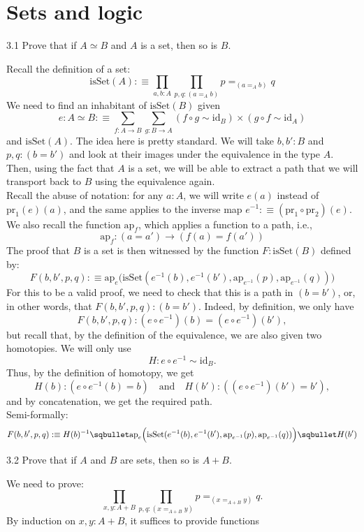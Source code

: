 \documentclass[14pt]{extarticle}
\newcommand{\0}{{\mathbf 0}}
\newcommand{\1}{{\mathbf 1}}
\newcommand{\2}{{\mathbf 2}}
\newcommand{\pr}{\mathrm{pr}}
\newcommand{\id}{\mathrm{id}}
\newcommand{\ap}{\mathrm{ap}}
\newcommand{\isSet}{\mathrm{isSet}}
\begin{document}
\section*{Sets and logic}
\begin{prob}{3.1}{}
Prove that if $A \simeq B$ and $A$ is a set, then so is $B$.
\end{prob}
Recall the definition of a set:
\[\isSet(A) :\equiv \prod_{a,b:A}\prod_{p,q:(a =_A b)} p =_{(a =_A b)} q\]
We need to find an inhabitant of $\isSet(B)$ given \[e : A \simeq B :\equiv \sum_{f:A\to B}\sum_{g:B\to A}(f \circ g \sim \id_{B}) \times (g \circ f \sim \id_{A})\] and $\isSet(A)$. The idea here is pretty standard. We will take $b,b' : B$ and $p,q : (b = b')$ and look at their images under the equivalence in the type $A$. Then, using the fact that $A$ is a set, we will be able to extract a path that we will transport back to $B$ using the equivalence again.\\
Recall the abuse of notation: for any $a : A$, we will write $e(a)$ instead of $\pr_1(e)(a)$, and the same applies to the inverse map $e^{-1} : \equiv (\pr_1 \circ \pr_2)(e)$. We also recall the function $\ap_f$, which applies a function to a path, i.e.,
\[\ap_f : (a = a') \to (f(a) = f(a'))\]
The proof that $B$ is a set is then witnessed by the function $F : \isSet(B)$ defined by:
\[F(b,b',p,q) : \equiv \ap_e\Big(\isSet(e^{-1}(b),e^{-1}(b'), \ap_{e^{-1}}(p), \ap_{e^{-1}}(q))\Big)\]
For this to be a valid proof, we need to check that this is a path in $(b = b')$, or, in other words, that $F(b,b',p,q) : (b = b')$. Indeed, by definition, we only have
\[F(b,b',p,q) : (e \circ e^{-1})(b) = (e \circ e^{-1})(b'),\] but recall that, by the definition of the equivalence, we are also given two homotopies. We will only use \[H : e \circ e^{-1} \sim \id_{B}.\] Thus, by the definition of homotopy, we get \[H(b) : (e \circ e^{-1}(b) = b) \quad \text{and} \quad H(b') : ((e \circ e^{-1})(b') = b'),\] and by concatenation, we get the required path.\\
Semi-formally:
\[F(b,b',p,q) : \equiv H(b)^{-1} \sqbullet \ap_e\Big(\isSet(e^{-1}(b),e^{-1}(b'), \ap_{e^{-1}}(p), \ap_{e^{-1}}(q))\Big) \sqbullet H(b')\]



\begin{prob}{3.2}{}
Prove that if $A$ and $B$ are sets, then so is $A + B$.
\end{prob}
We need to prove:
\[\prod_{x,y:A+B}\prod_{p,q:(x =_{A+B} y)} p =_{(x =_{A+B} y)} q.\] By induction on $x,y : A+B$, it suffices to provide functions
\end{document}
